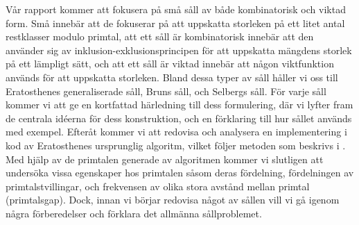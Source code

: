 Vår rapport kommer att fokusera på små såll av både kombinatorisk och viktad form. 
Små innebär att de fokuserar på att uppskatta storleken på ett litet antal restklasser modulo primtal, att ett såll är kombinatorisk innebär att den använder sig av inklusion-exklusionsprincipen för att uppskatta mängdens storlek på ett lämpligt sätt, och att ett såll är viktad innebär att någon viktfunktion används för att uppskatta storleken. 
Bland dessa typer av såll håller vi oss till Eratosthenes generaliserade såll, Bruns såll, och Selbergs såll. 
För varje såll kommer vi att ge en kortfattad härledning till dess formulering, där vi lyfter fram de centrala idéerna för dess konstruktion, och en förklaring till hur sållet används med exempel. 
Efteråt kommer vi att redovisa och analysera en implementering i kod av Eratosthenes ursprunglig algoritm, vilket följer metoden som beskrivs i \cite{HaraldSieve}.
Med hjälp av de primtalen generade av algoritmen kommer vi slutligen att undersöka vissa egenskaper hos primtalen såsom deras fördelning, fördelningen av primtalstvillingar, och frekvensen av olika stora avstånd mellan primtal (primtalsgap).
Dock, innan vi börjar redovisa något av sållen vill vi gå igenom några förberedelser och förklara det allmänna sållproblemet.
